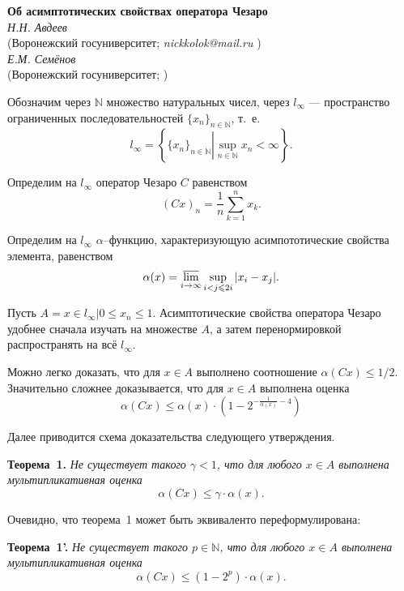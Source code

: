 \documentclass[a5paper,12pt,openbib]{report}
\begin{document}



\begin{center}{ \bf  Об асимптотических свойствах оператора Чезаро }\\
{\it Н.Н. Авдеев } \\
(Воронежский госуниверситет; {\it nickkolok@mail.ru} ) \\
{\it Е.М. Семёнов } \\
(Воронежский госуниверситет; %
)
\end{center}


Обозначим через $\mathbb{N}$ множество натуральных чисел,
через $l_\infty$ --- пространство ограниченных последовательностей $\{x_n\}_{n\in\mathbb{N}}$,
т.~е.
$$
	l_\infty = \left\{
		\{x_n\}_{n \in \mathbb{N}} \left|
			\sup_{n\in\mathbb{N}} x_n < \infty
		\right.
	\right\}.
$$

Определим на $l_\infty$ оператор Чезаро $C$
равенством
$$
	(Cx)_n = \frac{1}{n}\sum_{k=1}^n x_k.
$$

Определим на $l_\infty$ $\alpha$--функцию,
характеризующую асимпототические свойства элемента,
равенством
$$
	\alpha(x) = \varlimsup_{i\to\infty}\sup_{i < j \leqslant 2i} |x_i - x_j|.
$$

Пусть $A = {x\in l_\infty | 0 \leqslant x_n \leqslant 1}$.
Асимптотические свойства оператора Чезаро удобнее сначала изучать на множестве $A$,
а затем перенормировкой распространять на всё $l_\infty$.

Можно легко доказать, что для $x\in A$ выполнено соотношение $\alpha(Cx) \leqslant 1/2$.
Значительно сложнее доказывается, что для $x\in A$ выполнена оценка
$$
	\alpha(Cx) \leqslant \alpha(x) \cdot
	\left(
		1 - 2 ^ {-\frac{1}{\alpha(x)} - 4}
	\right)
$$ 

Далее приводится схема доказательства следующего утверждения.


\textbf{Теорема~1.}
{\it
	Не существует такого $\gamma < 1$,
	что для любого $x\in A$ выполнена мультипликативная оценка
	$$
		\alpha(Cx) \leqslant \gamma \cdot \alpha(x).
	$$
}

Очевидно, что теорема~1 может быть эквиваленто переформулирована:

\textbf{Теорема~1'.}
{\it
	Не существует такого $p\in \mathbb{N}$,
	что для любого $x\in A$ выполнена мультипликативная оценка
	$$
		\alpha(Cx) \leqslant (1-2^p)\cdot \alpha(x).
	$$
}
\end{document}

